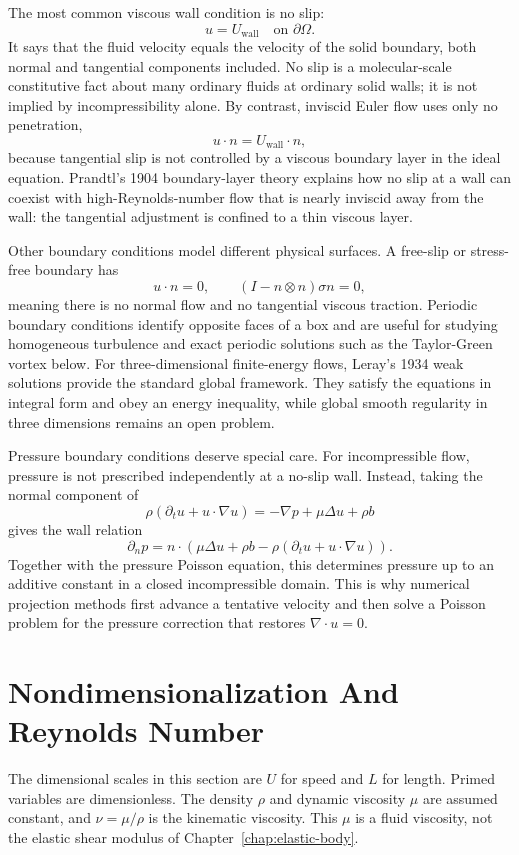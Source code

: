 The most common viscous wall condition is no slip:
\[
  \boxed{u=U_{\mathrm{wall}}\quad\text{on }\partial\Omega.}
\]
It says that the fluid velocity equals the velocity of the solid boundary, both
normal and tangential components included. No slip is a molecular-scale
constitutive fact about many ordinary fluids at ordinary solid walls; it is not
implied by incompressibility alone. By contrast, inviscid Euler flow uses only
no penetration,
\[
  u\cdot n=U_{\mathrm{wall}}\cdot n,
\]
because tangential slip is not controlled by a viscous boundary layer in the
ideal equation.
Prandtl's 1904 boundary-layer theory explains how no slip at a wall can coexist
with high-Reynolds-number flow that is nearly inviscid away from the wall: the
tangential adjustment is confined to a thin viscous layer.

Other boundary conditions model different physical surfaces. A free-slip or
stress-free boundary has
\[
  u\cdot n=0,
  \qquad
  (I-n\otimes n)\sigma n=0,
\]
meaning there is no normal flow and no tangential viscous traction. Periodic
boundary conditions identify opposite faces of a box and are useful for
studying homogeneous turbulence and exact periodic solutions such as the
Taylor-Green vortex below.
For three-dimensional finite-energy flows, Leray's 1934 weak solutions provide
the standard global framework. They satisfy the equations in integral form and
obey an energy inequality, while global smooth regularity in three dimensions
remains an open problem.

Pressure boundary conditions deserve special care. For incompressible flow,
pressure is not prescribed independently at a no-slip wall. Instead, taking the
normal component of
\[
  \rho(\partial_tu+u\cdot\nabla u)
  =
  -\nabla p+\mu\Delta u+\rho b
\]
gives the wall relation
\[
  \partial_n p
  =
  n\cdot
  \left(
    \mu\Delta u+\rho b-\rho(\partial_tu+u\cdot\nabla u)
  \right).
\]
Together with the pressure Poisson equation, this determines pressure up to an
additive constant in a closed incompressible domain. This is why numerical
projection methods first advance a tentative velocity and then solve a Poisson
problem for the pressure correction that restores \(\nabla\cdot u=0\).

\section{Nondimensionalization And Reynolds Number}
\label{sec:reynolds-number}

The dimensional scales in this section are \(U\) for speed and \(L\) for
length.  Primed variables are dimensionless.  The density \(\rho\) and dynamic
viscosity \(\mu\) are assumed constant, and
\(\nu=\mu/\rho\) is the kinematic viscosity.  This \(\mu\) is a fluid
viscosity, not the elastic shear modulus of Chapter~\ref{chap:elastic-body}.

